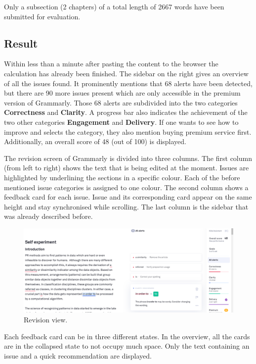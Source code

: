 \documentclass[runningheads]{llncs}
\let\OldTextregistered\textregistered
\renewcommand{\textregistered}{\OldTextregistered\xspace}
\begin{document}
Only a subsection (2 chapters) of a total length of 2667 words have been submitted for evaluation.

\subsection{Result}
Within less than a minute after pasting the content to the browser the calculation has already been finished. The sidebar on the right gives an overview of all the issues found. It prominently mentions that 68 alerts have been detected, but there are 90 more issues present which are only accessible in the premium version of Grammarly\textregistered. Those 68 alerts are subdivided into the two categories \textbf{Correctness} and \textbf{Clarity}. A progress bar also indicates the achievement of the two other categories \textbf{Engagement} and \textbf{Delivery}. If one wants to see how to improve and selects the category, they also mention buying premium service first. Additionally, an overall score of 48 (out of 100) is displayed.

The revision screen of Grammarly\textregistered is divided into three columns. The first column (from left to right) shows the text that is being edited at the moment. Issues are highlighted by underlining the sections in a specific colour. Each of the before mentioned issue categories is assigned to one colour. The second column shows a feedback card for each issue. Issue and its corresponding card appear on the same height and stay synchronised while scrolling. The last column is the sidebar that was already described before. 

\begin{figure}[H]
  \includegraphics[width=\linewidth]{images/view.png}
  \caption{Revision view.}
  \label{fig:revision}
\end{figure}

Each feedback card can be in three different states. In the overview, all the cards are in the collapsed state to not occupy much space. Only the text containing an issue and a quick recommendation are displayed.
\end{document}
